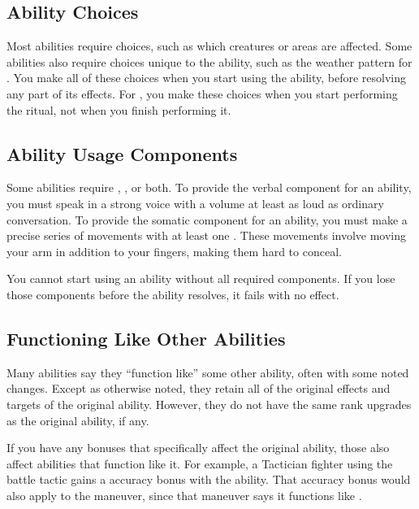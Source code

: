   \subsection{Ability Choices}\label{Ability Choices}
    Most abilities require choices, such as which creatures or areas are affected.
    Some abilities also require choices unique to the ability, such as the weather pattern for .
    You make all of these choices when you start using the ability, before resolving any part of its effects.
    For , you make these choices when you start performing the ritual, not when you finish performing it.

  \subsection{Ability Usage Components}\label{Ability Usage Components}
    Some abilities require , , or both.
    To provide the verbal component for an ability, you must speak in a strong voice with a volume at least as loud as ordinary conversation.
    To provide the somatic component for an ability, you must make a precise series of movements with at least one .
    These movements involve moving your arm in addition to your fingers, making them hard to conceal.

    You cannot start using an ability without all required components.
    If you lose those components before the ability resolves, it fails with no effect.

  \subsection{Functioning Like Other Abilities}\label{Functioning Like Other Abilities}
    Many abilities say they ``function like'' some other ability, often with some noted changes.
    Except as otherwise noted, they retain all of the original effects and targets of the original ability.
    However, they do not have the same rank upgrades as the original ability, if any.

    If you have any bonuses that specifically affect the original ability, those also affect abilities that function like it.
    For example, a Tactician fighter using the  battle tactic gains a  accuracy bonus with the  ability.
    That accuracy bonus would also apply to the  maneuver, since that maneuver says it functions like .

